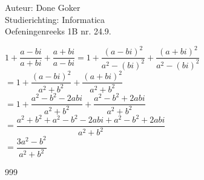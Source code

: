 \documentclass[a4paper]{article}
\begin{document}
  
\noindent\large Auteur: Done Goker \\
\noindent\large Studierichting: Informatica\\
\noindent\large Oefeningenreeks 1B nr. 24.9.\\

\medskip

\normalsize

$ 1 + \dfrac{a - bi}{a + bi} + \dfrac{a + bi}{a - bi} = 1 + \dfrac{(a - bi)^2}{a^2 - (bi)^2} + \dfrac{(a + bi)^2}{a^2 - (bi)^2} $\\

$ = 1 + \dfrac{(a - bi)^2}{a^2 + b^2} + \dfrac{(a + bi)^2}{a^2 + b^2} $\\

$ = 1 + \dfrac{a^2 - b^2 - 2abi}{a^2 + b^2} + \dfrac{a^2 - b^2 + 2abi}{a^2 + b^2} $\\

$ = \dfrac{a^2 + b^2 + a^2 - b^2 - 2abi + a^2 - b^2 + 2abi}{a^2 + b^2} $\\

$ = \dfrac{3a^2 - b^2}{a^2 + b^2} $

\begin{thebibliography}{999}
\end{thebibliography}
\end{document}
